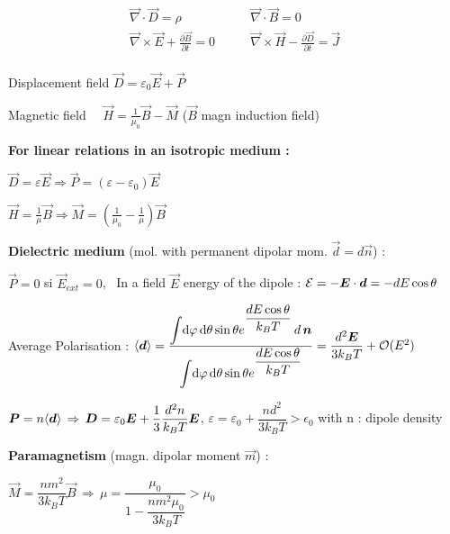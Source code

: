 \begin{squishlist}

\item[] $$\boxed{\begin{split}
	\vec{\nabla}\cdot\vec{D} = \rho  \qquad &\vec{\nabla} \cdot \vec{B} = 0\\
	\vec{\nabla}\times \vec{E} + \frac{\partial\vec{B}}{\partial t} = 0 \qquad & \vec{\nabla} \times \vec{H} - \frac{\partial \vec{D}}{\partial t} = \vec{J}\\
	\end{split}}$$
\item Displacement field $\vec{D}=\varepsilon_0\vec{E}+\vec{P} \quad $

\item Magnetic field $\quad \vec{H}=\frac{1}{\mu_0}\vec{B}-\vec{M}$ ($\vec{B}$ magn induction field)

\item[] \textbf{For linear relations in an isotropic medium :}
\item $\vec{D}=\varepsilon\vec{E}\Rightarrow\vec{P}=(\varepsilon-\varepsilon_0)\vec{E} \quad$ 

\item $\vec{H} = \frac{1}{\mu}\vec{B} \Rightarrow \vec{M} =  \left(\frac{1}{\mu_0} - \frac{1}{\mu}\right) \vec{B}$

\item[] \textbf{Dielectric medium} (mol. with permanent dipolar mom. $\vec{d} = d\vec{n}$) :

\item $\vec{P} = 0$ si $\vec{E}_{ext} =0$, \, In a field $\vec{E}$ energy of the dipole : $\mathcal{E} = -\mbox{\boldmath$E$}\cdot\mbox{\boldmath$d$} = - dE\cos\theta$\\

\item Average Polarisation : $\langle\mbox{\boldmath$d$}\rangle = \dfrac{\displaystyle{\int} \textrm{d} \varphi \, \textrm{d} \theta \sin\theta e^{\dfrac{d E \cos\theta}{k_BT}}\,d \,\mbox{\boldmath$n$}}{\displaystyle{\int} \textrm{d} \varphi \, \textrm{d} \theta \sin\theta e^{\dfrac{d E \cos\theta}{k_B T}}} = \dfrac{d^2 \mbox{\boldmath$E$}}{3k_BT} + \mathcal{O}(E^2) $

\item $\mbox{\boldmath$P$} = n\langle\mbox{\boldmath$d$}\rangle \, \Rightarrow \, \mbox{\boldmath$D$} = \varepsilon_0 \mbox{\boldmath$E$} + \dfrac{1}{3} \dfrac{d^2 n}{k_B T}\mbox{\boldmath$E$}$, $\varepsilon = \varepsilon_0 + \dfrac{nd^2}{3k_B T} > \epsilon_0$ with n : dipole density


\item[] \textbf{Paramagnetism} (magn. dipolar moment $\vec{m}$) :

\item $\vec{M} = \dfrac{ n m^2}{3k_B T} \vec{B} \, \Rightarrow \, \mu = \dfrac{\mu_0}{1-\dfrac{nm^2\mu_0}{3k_BT}} > \mu_0$\\
\end{squishlist}

